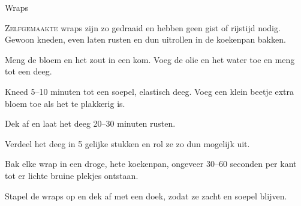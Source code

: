 \begin{recipe}{Wraps}
\label{recipe:wraps}


\lettrine{Z}{elfgemaakte} wraps zijn zo gedraaid en hebben geen gist of
rijstijd nodig. Gewoon kneden, even laten rusten en dun uitrollen in de
koekenpan bakken.

\begin{ingredients}
\end{ingredients}

\begin{steps}
  \item Meng de bloem en het zout in een kom. Voeg de olie en het water toe
        en meng tot een deeg.
  \item Kneed 5–10 minuten tot een soepel, elastisch deeg. Voeg een klein
        beetje extra bloem toe als het te plakkerig is.
  \item Dek af en laat het deeg 20–30 minuten rusten.
  \item Verdeel het deeg in 5 gelijke stukken en rol ze zo dun mogelijk uit.
  \item Bak elke wrap in een droge, hete koekenpan, ongeveer 30–60 seconden
        per kant tot er lichte bruine plekjes ontstaan.
  \item Stapel de wraps op en dek af met een doek, zodat ze zacht en soepel
        blijven.
\end{steps}
\end{recipe}
